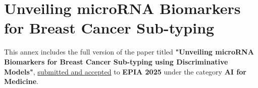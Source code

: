 
%

\chapter{Unveiling microRNA Biomarkers for Breast Cancer Sub-typing}
\label{ann:EPIA_paper}

This annex includes the full version of the paper titled \textbf{"Unveiling
  microRNA Biomarkers for Breast Cancer Sub-typing using Discriminative Models"},
\underline{submitted and accepted} to \textbf{EPIA 2025} under the category \textbf{AI for
  Medicine}.

